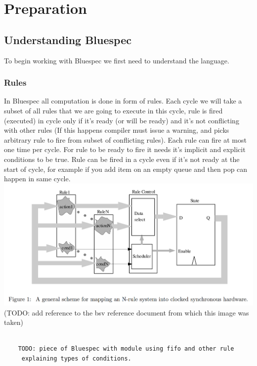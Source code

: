 \documentclass[14pt]{report}
\begin{document}
\chapter{Preparation}

\section{Understanding Bluespec}
To begin working with Bluespec we first need to understand the language.
\subsection{Rules}
 In Bluespec all computation is done in form of rules. Each cycle we will take a subset of all rules that we are going to execute in this cycle, rule is fired (executed) in cycle only if it's ready (or will be ready) and it's not conflicting with other rules (If this happens compiler must issue a warning, and picks arbitrary rule to fire from subset of conflicting rules). Each rule can fire at most one time per cycle. For rule to be ready to fire it needs it's implicit and explicit conditions to be true. Rule can be fired in a cycle even if it's not ready at the start of cycle, for example if you add item on an empty queue and then pop can happen in same cycle.\\
\includegraphics[width=\textwidth]{Rulemapping.png}
(TODO: add reference to the bsv reference document from which this image was taken)
\begin{verbatim}
        
    TODO: piece of Bluespec with module using fifo and other rule
     explaining types of conditions.
    
\end{verbatim}
\end{document}
